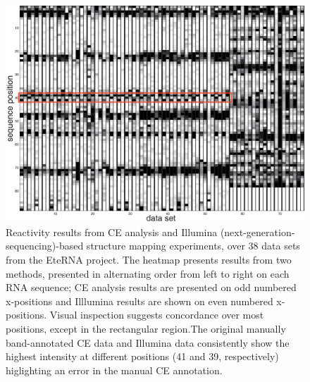 \documentclass[letter]{bioinfo}
\begin{document}
\begin{figure}
\centering
\includegraphics[width=\linewidth]{figures/supp_eterna_comparison}
\caption{Reactivity results from CE analysis and Illumina (next-generation-sequencing)-based structure mapping experiments, over 38 data sets from the EteRNA project. The heatmap presents results from two methods, presented in alternating order from left to right on each RNA sequence; CE analysis results are presented on odd numbered x-positions and Illlumina results are shown on even numbered x-positions. Visual inspection suggests concordance over most positions, except in the rectangular region.The original manually band-annotated CE data and Illumina data consistently show the highest intensity at different positions (41 and 39, respectively) higlighting an error in the manual CE annotation.}
\label{f:eterna_comparison}
\end{figure}
\end{document}
